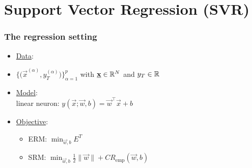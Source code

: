 \section{Support Vector Regression (SVR)}


\begin{frame}\frametitle{The regression setting}


\begin{itemize}
\item[] \underline{Data}:\\

    \item[]$
    \big\{ \big(\vec x^{(\alpha)}, y_{T}^{(\alpha)}\big)\big\}_{\alpha=1}^{p}
    $ with $\underline{\mathbf{x}} \in \mathbb{R}^{N}$ and $y_{T} \in \mathbb{R}${}

\item[] \underline{Model}:\\
    linear neuron: $
        y(\vec x; \vec w, b) = \vec w^{\top} \vec x + b$
        
\item[] \underline{Objective}:\\
    \begin{itemize}
    \item ERM: $\min_{\vec w,b} E^{T}$
    \item SRM: $\min_{\vec w,b} \frac{1}{2} \lVert \vec w \rVert + C R_{\text{emp}}(\vec w,b)$
    \end{itemize}

    
\end{itemize}



\end{frame}
